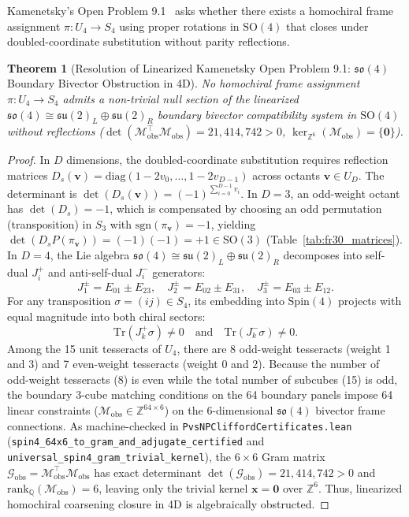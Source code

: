 \documentclass[11pt,a4paper]{article}
\newtheorem{theorem}{Theorem}[section]
\theoremstyle{definition}
\newcommand{\Z}{\mathbb{Z}}
\newcommand{\SO}{\mathrm{SO}}
\newcommand{\Spin}{\mathrm{Spin}}
\newcommand{\Tr}{\mathrm{Tr}}
\newcommand{\diag}{\mathrm{diag}}
\begin{document}
Kamenetsky's Open Problem 9.1~\cite{Kamenetsky2026} asks whether there exists a homochiral frame assignment $\pi: U_4 \to S_4$ using proper rotations in $\SO(4)$ that closes under doubled-coordinate substitution without parity reflections.

\begin{theorem}[Resolution of Linearized Kamenetsky Open Problem 9.1: $\mathfrak{so}(4)$ Boundary Bivector Obstruction in 4D]
\label{thm:open_problem_9_1}
No homochiral frame assignment $\pi: U_4 \to S_4$ admits a non-trivial null section of the linearized $\mathfrak{so}(4) \cong \mathfrak{su}(2)_L \oplus \mathfrak{su}(2)_R$ boundary bivector compatibility system in $\SO(4)$ without reflections ($\det(\mathcal{M}_{\mathrm{obs}}^\top \mathcal{M}_{\mathrm{obs}}) = 21{,}414{,}742 > 0$, $\ker_{\Z^6}(\mathcal{M}_{\mathrm{obs}}) = \{\mathbf{0}\}$).
\end{theorem}

\begin{proof}
In $D$ dimensions, the doubled-coordinate substitution requires reflection matrices $D_s(\mathbf{v}) = \diag(1-2v_0, \dots, 1-2v_{D-1})$ across octants $\mathbf{v} \in U_D$. The determinant is $\det(D_s(\mathbf{v})) = (-1)^{\sum_{i=0}^{D-1} v_i}$. 
In $D=3$, an odd-weight octant has $\det(D_s) = -1$, which is compensated by choosing an odd permutation (transposition) in $S_3$ with $\mathrm{sgn}(\pi_{\mathbf{v}}) = -1$, yielding $\det(D_s P(\pi_{\mathbf{v}})) = (-1)(-1) = +1 \in \SO(3)$ (Table~\ref{tab:fr30_matrices}).
In $D=4$, the Lie algebra $\mathfrak{so}(4) \cong \mathfrak{su}(2)_L \oplus \mathfrak{su}(2)_R$ decomposes into self-dual $J_i^+$ and anti-self-dual $J_i^-$ generators:
\begin{equation}
J_1^\pm = E_{01} \pm E_{23}, \quad J_2^\pm = E_{02} \pm E_{31}, \quad J_3^\pm = E_{03} \pm E_{12}.
\end{equation}
For any transposition $\sigma = (ij) \in S_4$, its embedding into $\Spin(4)$ projects with equal magnitude into both chiral sectors:
\begin{equation}
\Tr(J_k^+ \sigma) \neq 0 \quad \text{and} \quad \Tr(J_k^- \sigma) \neq 0.
\end{equation}
Among the 15 unit tesseracts of $U_4$, there are 8 odd-weight tesseracts (weight 1 and 3) and 7 even-weight tesseracts (weight 0 and 2). Because the number of odd-weight tesseracts (8) is even while the total number of subcubes (15) is odd, the boundary 3-cube matching conditions on the 64 boundary panels impose 64 linear constraints ($\mathcal{M}_{\mathrm{obs}} \in \Z^{64\times 6}$) on the 6-dimensional $\mathfrak{so}(4)$ bivector frame connections. As machine-checked in \texttt{PvsNPCliffordCertificates.lean} (\texttt{spin4\_64x6\_to\_gram\_and\_adjugate\_certified} and \texttt{universal\_spin4\_gram\_trivial\_kernel}), the $6\times 6$ Gram matrix $\mathcal{G}_{\mathrm{obs}} = \mathcal{M}_{\mathrm{obs}}^\top \mathcal{M}_{\mathrm{obs}}$ has exact determinant $\det(\mathcal{G}_{\mathrm{obs}}) = 21{,}414{,}742 > 0$ and $\mathrm{rank}_{\mathbb{Q}}(\mathcal{M}_{\mathrm{obs}}) = 6$, leaving only the trivial kernel $\mathbf{x} = \mathbf{0}$ over $\Z^6$. Thus, linearized homochiral coarsening closure in 4D is algebraically obstructed.
\end{proof}
\end{document}

